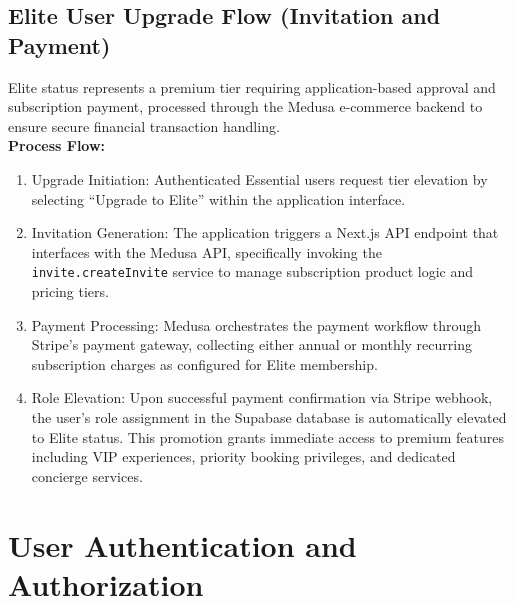 \subsection{Elite User Upgrade Flow (Invitation and Payment)}
Elite status represents a premium tier requiring application-based approval and subscription payment, processed through the Medusa e-commerce backend to ensure secure financial transaction handling. \\
\textbf{Process Flow:}
\begin{enumerate}
    \item Upgrade Initiation: Authenticated Essential users request tier elevation by selecting ``Upgrade to Elite'' within the application interface.
    \item Invitation Generation: The application triggers a Next.js API endpoint that interfaces with the Medusa API, specifically invoking the \texttt{invite.createInvite} service to manage subscription product logic and pricing tiers.
    \item Payment Processing: Medusa orchestrates the payment workflow through Stripe's payment gateway, collecting either annual or monthly recurring subscription charges as configured for Elite membership.
    \item Role Elevation: Upon successful payment confirmation via Stripe webhook, the user's role assignment in the Supabase database is automatically elevated to Elite status. This promotion grants immediate access to premium features including VIP experiences, priority booking privileges, and dedicated concierge services.
\end{enumerate}

\section{User Authentication and Authorization}
\label{section:User Authentication and Authorization}
